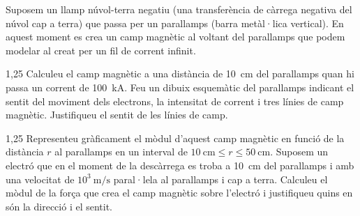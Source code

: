 Suposem un llamp núvol-terra negatiu (una transferència de càrrega negativa del núvol cap a terra) que passa per un parallamps (barra metàl·lica vertical). En aquest moment es crea un camp magnètic al voltant del parallamps que podem modelar al creat per un fil de corrent infinit.

\begin{apartat}{1,25}
Calculeu el camp magnètic a una distància de 10~cm del parallamps quan hi passa un corrent de 100~kA. Feu un dibuix esquemàtic del parallamps indicant el sentit del moviment dels electrons, la intensitat de corrent i tres línies de camp magnètic. Justifiqueu el sentit de les línies de camp.
\end{apartat}

\begin{apartat}{1,25}
Representeu gràficament el mòdul d'aquest camp magnètic en funció de la distància $r$ al parallamps en un interval de $10\ \mathrm{cm} \le r \le 50\ \mathrm{cm}$. Suposem un electró que en el moment de la descàrrega es troba a 10~cm del parallamps i amb una velocitat de $10^{3}\ \mathrm{m/s}$ paral·lela al parallamps i cap a terra. Calculeu el mòdul de la força que crea el camp magnètic sobre l'electró i justifiqueu quins en són la direcció i el sentit.
\end{apartat}



